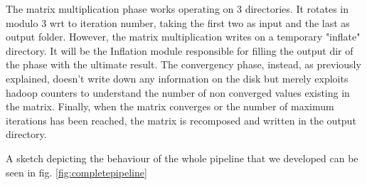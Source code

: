 The matrix multiplication phase works operating on 3 directories. It rotates in modulo 3 wrt to iteration number, taking the first two as input and the last as output folder.
However, the matrix multiplication writes on a temporary "inflate" directory. It will be the Inflation module responsible for filling the output dir of the phase with the ultimate result.
The convergency phase, instead, as previously explained, doesn't write down any information on the disk but merely exploits hadoop counters to understand the number of non converged values existing in the matrix.
Finally, when the matrix converges or the number of maximum iterations has been reached, the matrix is recomposed and written in the output directory.

A sketch depicting the behaviour of the whole pipeline that we developed can be seen in fig. \ref{fig:completepipeline}
\newpage
